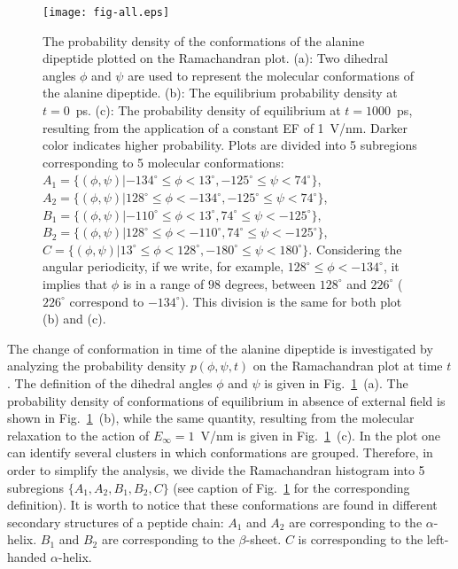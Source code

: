 \documentclass[a4paper,preprint,unsortedaddress,onecolumn]{revtex4-1}
\newcommand{\recheck}[1]{{\color{red} #1}}
\begin{document}
\begin{figure}
  \centering
  \texttt{[image: fig-all.eps]}
  \caption{
    \recheck{
    The probability density of the conformations of the alanine dipeptide plotted on the Ramachandran plot.
    (a): Two dihedral angles
    $\phi$ and $\psi$ are used to represent the molecular conformations of the alanine dipeptide.
    (b): The equilibrium probability density 
    at $t=0$~\textsf{ps}. (c): The probability density of equilibrium at $t=1000$~\textsf{ps}, resulting from the application of a constant EF of 1~V/nm. Darker color
    indicates higher probability.
    Plots are divided into 5 subregions corresponding
    to 5 molecular conformations:
    $A_1 = \{(\phi, \psi) | -134^\circ \leq \phi <  13^\circ, -125^\circ \leq \psi < 74^\circ\}$,
    $A_2 = \{(\phi, \psi) |  128^\circ \leq \phi <-134^\circ, -125^\circ \leq \psi < 74^\circ\}$,
    $B_1 = \{(\phi, \psi) | -110^\circ \leq \phi <  13^\circ,   74^\circ \leq \psi <-125^\circ\}$,
    $B_2 = \{(\phi, \psi) |  128^\circ \leq \phi <-110^\circ,   74^\circ \leq \psi <-125^\circ\}$,
    $C   = \{(\phi, \psi) |   13^\circ \leq \phi < 128^\circ, -180^\circ \leq \psi < 180^\circ\}$.
    Considering the angular periodicity, if we write, for example,
    $128^\circ \leq \phi <-134^\circ$, it implies that $\phi$ is in a range of $98$ degrees, between $128^\circ$ and $226^\circ$ ($226^\circ$ correspond to $-134^\circ$).
    This division is the same for both plot (b) and (c).
    }
  }
  \label{fig:tmp4}
\end{figure}

\recheck{
The change of conformation in time of the alanine dipeptide is
investigated by analyzing the probability density $p(\phi,\psi,t)$ on
the Ramachandran plot at time $t$. The definition of the dihedral
angles $\phi$ and $\psi$ is given in Fig.~\ref{fig:tmp4}~(a).
The probability density of conformations of equilibrium in absence of external field is shown in Fig.~\ref{fig:tmp4}~(b), while the same quantity, resulting from the molecular relaxation to the action of $E_{\infty} = 1$~V/nm is
given in Fig.~\ref{fig:tmp4}~(c). In the plot one can identify several clusters
in which conformations are grouped.
Therefore, in order to simplify the analysis, we divide the
Ramachandran histogram into 5 subregions $\{A_1, A_2, B_1, B_2, C\}$
(see caption of Fig.~\ref{fig:tmp4} for the corresponding definition).
It is worth to notice that these conformations
are found in different secondary structures of a peptide chain:
$A_1$ and $A_2$ are
corresponding to the $\alpha$-helix. $B_1$ and $B_2$ are
corresponding to the $\beta$-sheet. $C$ is corresponding to the
left-handed $\alpha$-helix.
}
\end{document}
